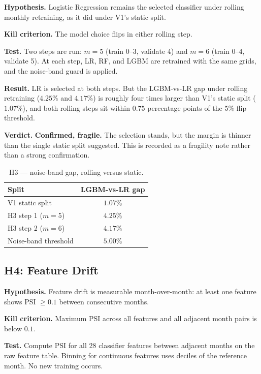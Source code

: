\documentclass[conference]{IEEEtran}
\begin{document}
\textbf{Hypothesis.} Logistic Regression remains the selected classifier
under rolling monthly retraining, as it did under V1's static split.

\textbf{Kill criterion.} The model choice flips in either rolling step.

\textbf{Test.} Two steps are run: $m=5$ (train 0--3, validate 4) and $m=6$
(train 0--4, validate 5). At each step, LR, RF, and LGBM are retrained with
the same grids, and the noise-band guard is applied.

\textbf{Result.} LR is selected at both steps. But the LGBM-vs-LR gap under
rolling retraining ($4.25\%$ and $4.17\%$) is roughly four times larger
than V1's static split ($1.07\%$), and both rolling steps sit within
$0.75$ percentage points of the $5\%$ flip threshold.

\textbf{Verdict.} \textbf{Confirmed, fragile.} The selection stands, but
the margin is thinner than the single static split suggested. This is
recorded as a fragility note rather than a strong confirmation.

\begin{table}[!t]
\caption{H3 — noise-band gap, rolling versus static.}
\label{tab:h3}
\centering
\small
\begin{tabular}{lc}
\toprule
Split & LGBM-vs-LR gap \\
\midrule
V1 static split        & $1.07\%$ \\
H3 step 1 ($m=5$)      & $4.25\%$ \\
H3 step 2 ($m=6$)      & $4.17\%$ \\
Noise-band threshold   & $5.00\%$ \\
\bottomrule
\end{tabular}
\end{table}

\subsection{H4: Feature Drift}

\textbf{Hypothesis.} Feature drift is measurable month-over-month: at least
one feature shows PSI $\geq 0.1$ between consecutive months.

\textbf{Kill criterion.} Maximum PSI across all features and all adjacent
month pairs is below $0.1$.

\textbf{Test.} Compute PSI for all 28 classifier features between adjacent
months on the raw feature table. Binning for continuous features uses
deciles of the reference month. No new training occurs.
\end{document}
